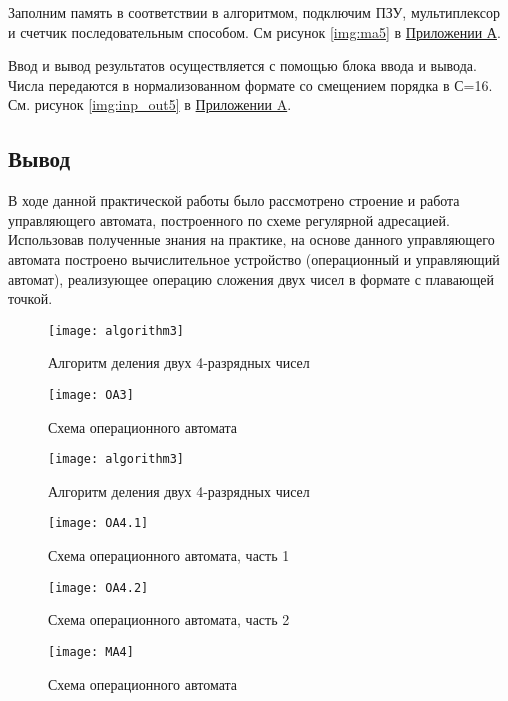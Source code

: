 \documentclass[a4paper,14pt]{extarticle}
\begin{document}
Заполним память в соответствии в алгоритмом, подключим ПЗУ, мультиплексор и счетчик последовательным способом. См рисунок \ref{img:ma5} в \hyperref[tam]{Приложении А}. 

Ввод и вывод результатов осуществляется с помощью блока ввода и вывода. Числа передаются в нормализованном формате со смещением порядка в С=16. См. рисунок \ref{img:inp_out5} в \hyperref[tam]{Приложении A}.


\subsection {Вывод}
В ходе данной практической работы было рассмотрено строение и работа управляющего автомата, построенного по схеме регулярной адресацией. Использовав полученные знания на практике, на основе данного управляющего автомата построено вычислительное устройство (операционный и управляющий автомат), реализующее операцию сложения двух чисел в формате с плавающей точкой.

\label{tam}

\begin{figure}[h!]	
	\centering
	\texttt{[image: algorithm3]}
	\caption {Алгоритм деления двух 4-разрядных чисел}
	\label{img:algorithm3}
\end{figure}
\newpage
\begin{figure}[h!]
	\centering
	\texttt{[image: OA3]}
	\caption {Схема операционного автомата}
	\label{img:oa3}
\end{figure}



\begin{figure}[h!]
	\centering
	\texttt{[image: algorithm3]}
	\caption {Алгоритм деления двух 4-разрядных чисел}
	\label{img:algorithm4}
\end{figure}
\newpage
\begin{figure}[htpb]
	\centering
	\texttt{[image: OA4.1]}
	\caption {Схема операционного автомата, часть 1}
	\label{img:oa4.1}
\end{figure}
\begin{figure}[htpb]
	\centering
	\texttt{[image: OA4.2]}
	\caption {Схема операционного автомата, часть 2}
	\label{img:oa4.2}
\end{figure}

\begin{figure}[h!]
	\centering
	\texttt{[image: MA4]}
	\caption {Схема операционного автомата}
	\label{img:ma4}
\end{figure}
\end{document}
